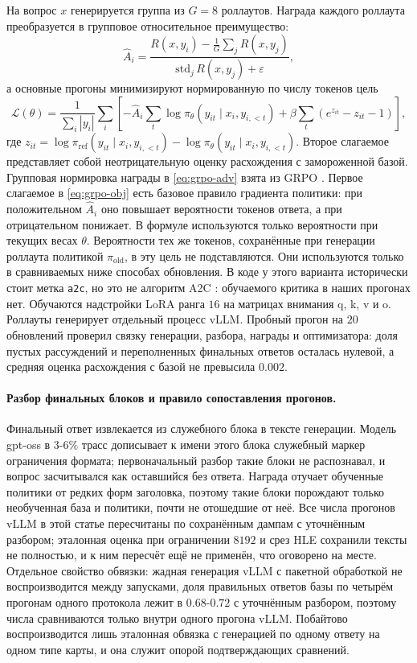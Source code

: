\documentclass[11pt]{article}
\begin{document}
На вопрос $x$ генерируется группа из $G=8$ роллаутов. Награда каждого роллаута преобразуется в групповое относительное преимущество:
\begin{equation}
\hat A_i=\frac{R(x,y_i)-\tfrac1G\sum_j R(x,y_j)}{\mathrm{std}_j\,R(x,y_j)+\varepsilon},
\label{eq:grpo-adv}
\end{equation}
а основные прогоны минимизируют нормированную по числу токенов цель
\begin{equation}
\mathcal L(\theta)=
\frac{1}{\sum_i |y_i|}
\sum_i\left[
  -\hat A_i\sum_t\log\pi_\theta(y_{it}\mid x_i,y_{i,<t})
  +\beta\sum_t\left(e^{z_{it}}-z_{it}-1\right)
\right],
\label{eq:grpo-obj}
\end{equation}
где $z_{it}=\log\pi_{\mathrm{ref}}(y_{it}\mid x_i,y_{i,<t})-\log\pi_\theta(y_{it}\mid x_i,y_{i,<t})$. Второе слагаемое представляет собой неотрицательную оценку расхождения с замороженной базой. Групповая нормировка награды в \eqref{eq:grpo-adv} взята из GRPO \citep{shao2024deepseekmath,deepseekr1}. Первое слагаемое в \eqref{eq:grpo-obj} есть базовое правило градиента политики: при положительном $\hat A_i$ оно повышает вероятности токенов ответа, а при отрицательном понижает. В формуле используются только вероятности при текущих весах $\theta$. Вероятности тех же токенов, сохранённые при генерации роллаута политикой $\pi_{\mathrm{old}}$, в эту цель не подставляются. Они используются только в сравниваемых ниже способах обновления. В коде у этого варианта исторически стоит метка \texttt{a2c}, но это не алгоритм A2C \citep{mnih2016a3c}: обучаемого критика в наших прогонах нет. Обучаются надстройки LoRA ранга $16$ на матрицах внимания q, k, v и o. Роллауты генерирует отдельный процесс vLLM. Пробный прогон на $20$ обновлений проверил связку генерации, разбора, награды и оптимизатора: доля пустых рассуждений и переполненных финальных ответов осталась нулевой, а средняя оценка расхождения с базой не превысила $0.002$.

\paragraph{Разбор финальных блоков и правило сопоставления прогонов.} Финальный ответ извлекается из служебного блока в тексте генерации. Модель gpt-oss в $3$-$6\%$ трасс дописывает к имени этого блока служебный маркер ограничения формата; первоначальный разбор такие блоки не распознавал, и вопрос засчитывался как оставшийся без ответа. Награда отучает обученные политики от редких форм заголовка, поэтому такие блоки порождают только необученная база и политики, почти не отошедшие от неё. Все числа прогонов vLLM в этой статье пересчитаны по сохранённым дампам с уточнённым разбором; эталонная оценка при ограничении $8192$ и срез HLE сохранили тексты не полностью, и к ним пересчёт ещё не применён, что оговорено на месте. Отдельное свойство обвязки: жадная генерация vLLM с пакетной обработкой не воспроизводится между запусками, доля правильных ответов базы по четырём прогонам одного протокола лежит в $0.68$-$0.72$ с уточнённым разбором, поэтому числа сравниваются только внутри одного прогона vLLM. Побайтово воспроизводится лишь эталонная обвязка с генерацией по одному ответу на одном типе карты, и она служит опорой подтверждающих сравнений.
\end{document}
